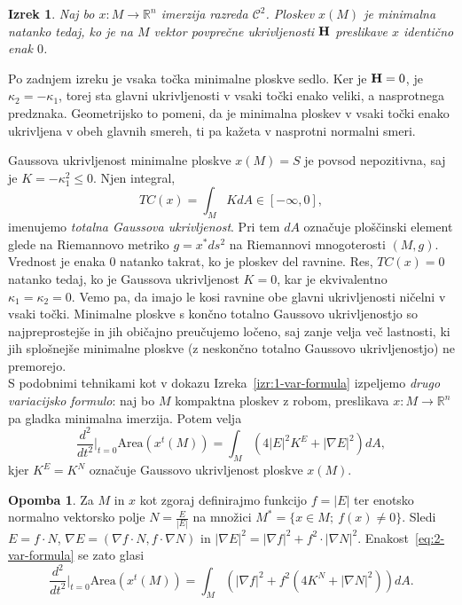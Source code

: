 \documentclass[12pt,a4paper,twoside]{article}
\theoremstyle{definition} %
\newtheorem{opomba}[definicija]{Opomba}
\theoremstyle{plain} %
\newtheorem{izrek}[definicija]{Izrek}
\numberwithin{equation}{section}  %
\newcommand{\R}{\mathbb R}
\begin{document}
\begin{izrek} \label{izr:min-ekviv-H=0}
Naj bo $x \colon M \to \R^{n}$ imerzija razreda $\mathcal{C}^2$. Ploskev $x(M)$ je minimalna natanko tedaj, ko je na $M$ vektor povprečne ukrivljenosti $\textbf{\textup{H}}$ preslikave $x$ identično enak $0$.
\end{izrek}

Po zadnjem izreku je vsaka točka minimalne ploskve sedlo. Ker je $\textup{\textbf{H}} = 0$, je $\kappa_2 = -\kappa_1$, torej sta glavni ukrivljenosti v vsaki točki enako veliki, a nasprotnega predznaka. Geometrijsko to pomeni, da je minimalna ploskev v vsaki točki enako ukrivljena v obeh glavnih smereh, ti pa kažeta v nasprotni normalni smeri.

Gaussova ukrivljenost minimalne ploskve $x(M)=S$ je povsod nepozitivna, saj je $K = -\kappa_{1}^2 \leq 0$.
Njen integral,
\begin{equation}
TC(x) = \int_{M} K dA \in [-\infty, 0],
\end{equation} 
imenujemo \emph{totalna Gaussova ukrivljenost}. Pri tem $dA$ označuje ploščinski element glede na Riemannovo metriko $g = x^{*}ds^2$ na Riemannovi mnogoterosti $(M,g)$.
Vrednost je enaka $0$ natanko takrat, ko je ploskev del ravnine. Res, $TC(x) = 0$ natanko tedaj, ko je Gaussova ukrivljenost $K=0$, kar je ekvivalentno $\kappa_1=\kappa_2=0$. Vemo pa, da imajo le kosi ravnine obe glavni ukrivljenosti ničelni v vsaki točki.
Minimalne ploskve s končno totalno Gaussovo ukrivljenostjo so najpreprostejše in jih običajno preučujemo ločeno, saj zanje velja več lastnosti, ki jih splošnejše minimalne ploskve (z neskončno totalno Gaussovo ukrivljenostjo) ne premorejo.\\[0.1cm]

S podobnimi tehnikami kot v dokazu Izreka~\ref{izr:1-var-formula} izpeljemo \emph{drugo variacijsko formulo}: naj bo $M$ kompaktna ploskev z robom, preslikava $x \colon M \to \mathbb{R}^{n}$ pa gladka minimalna imerzija. Potem velja
\begin{equation} \label{eq:2-var-formula}
\frac{d^2}{dt^2} \Big|_{t=0} \text{Area} \left(x^{t}(M)\right) = \int_{M} {\left( 4|E|^{2} K^{E} + |\nabla{E}|^2 \right) dA},
\end{equation}
kjer $K^{E} = K^{N}$ označuje Gaussovo ukrivljenost ploskve $x(M)$.

\begin{opomba}
Za $M$ in $x$ kot zgoraj definirajmo funkcijo $f = |E|$ ter enotsko normalno vektorsko polje $N = \frac{E}{|E|}$ na množici $M^{*} = \{ x \in M ; \ f(x) \neq 0 \}$. Sledi $E = f \cdot N$, $\nabla E = (\nabla f \cdot N, f \cdot \nabla N)$ in $|\nabla E|^2 = |\nabla f|^2 + f^2 \cdot |\nabla N|^2$.
Enakost~\eqref{eq:2-var-formula} se zato glasi
\begin{equation}
\frac{d^2}{dt^2} \Big|_{t=0} \text{Area} \left(x^{t}(M)\right) = \int_{M} {\left( |\nabla f|^2 + f^2 (4K^{N} + |\nabla N|^2) \right) dA}.
\end{equation}
\end{opomba}
\end{document}

